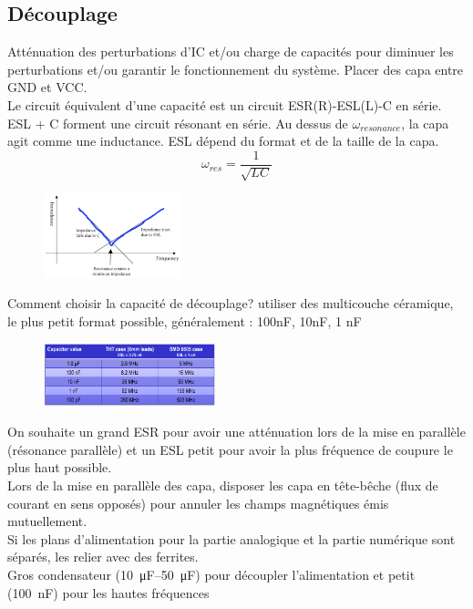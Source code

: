 \documentclass[resume]{subfiles}
\begin{document}
\begin{multicols}{3}
\subsection{Découplage}
Atténuation des perturbations d'IC et/ou charge de capacités pour diminuer les perturbations et/ou garantir le fonctionnement du système. Placer des capa entre GND et VCC.\\
Le circuit équivalent d'une capacité est un circuit ESR(R)-ESL(L)-C en série. ESL + C forment une circuit résonant en série. Au dessus de $\omega_{resonance}$, la capa agit comme une inductance. ESL dépend du format et de la taille de la capa.\\
$$\omega_{res}=\frac{1}{\sqrt{LC}}$$
\begin{figure}[H]
\centering
\includegraphics[width=4.00cm]{img_7.png}
\end{figure}
Comment choisir la capacité de découplage? utiliser des multicouche céramique, le plus petit format possible, généralement : 100nF, 10nF, 1 nF\\
\begin{figure}[H]
\centering
\includegraphics[width=5.00cm]{img_8.png}
\end{figure}
On souhaite un grand ESR pour avoir une atténuation lors de la mise en parallèle (résonance parallèle) et un ESL petit pour avoir la plus fréquence de coupure le plus haut possible.\\
Lors de la mise en parallèle des capa, disposer les capa en tête-bêche (flux de courant en sens opposés) pour annuler les champs magnétiques émis mutuellement.\\
Si les plans d'alimentation pour la partie analogique et la partie numérique sont séparés, les relier avec des ferrites.\\
Gros condensateur (\SIrange{10}{50}{\micro\farad}) pour découpler l'alimentation et petit (\SI{100}{\nano\farad}) pour les hautes fréquences

\end{multicols}
\end{document}
